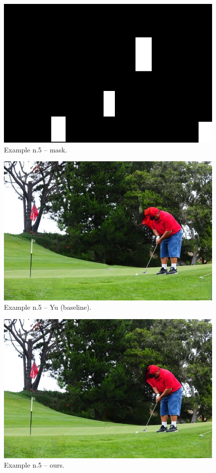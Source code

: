 \documentclass[a4paper, 11pt]{article}
\begin{document}
\begin{figure}
    \centering
    \includegraphics[width=.95\linewidth]{documentation/img/masks/0032_mask.png}
    \caption{Example n.5 -- mask.}
    \label{img:ex_n.5_mask}
\end{figure}
\begin{figure}
    \centering
    \includegraphics[width=.95\linewidth]{documentation/img/baseline/0032.png}
    \caption{Example n.5 -- Yu (baseline).}
    \label{img:ex_n.5_mask}
\end{figure}
\begin{figure}
    \centering
    \includegraphics[width=.95\linewidth]{documentation/img/modified/0032.png}
    \caption{Example n.5 -- ours.}
    \label{img:ex_n.5_mask}
\end{figure}
\end{document}

